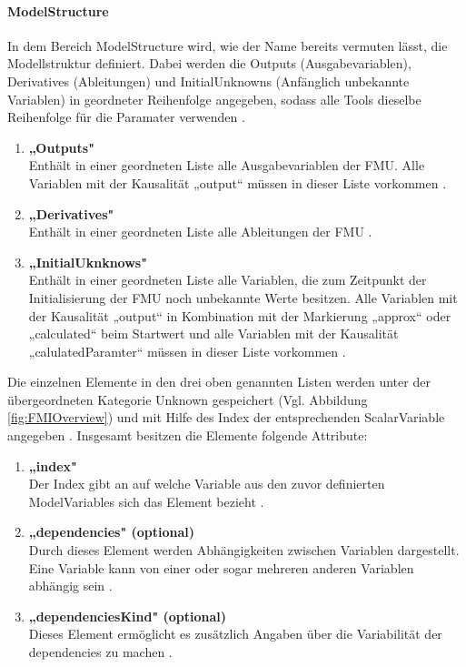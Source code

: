 \paragraph{ModelStructure}\label{sec:ModelStructure}
\noindent In dem Bereich ModelStructure wird, wie der Name bereits vermuten lässt, die Modellstruktur definiert. Dabei werden die Outputs (Ausgabevariablen), Derivatives (Ableitungen) und InitialUnknowns (Anfänglich unbekannte Variablen) in geordneter Reihenfolge angegeben, sodass alle Tools dieselbe Reihenfolge für die Paramater verwenden \cite[S.57]{25}.
\begin{enumerate}
	\item \textbf{„Outputs"} \cite[S.60]{25} \\
	Enthält in einer geordneten Liste alle Ausgabevariablen der FMU. Alle Variablen mit der 
	Kausalität „output“ müssen in dieser Liste vorkommen \cite[S.60]{25}.
	\item \textbf{„Derivatives"} \cite[S.60f]{25} \\
	Enthält in einer geordneten Liste alle Ableitungen der FMU \cite[S.60f]{25}.
	\item \textbf{„InitialUknknows"} \cite[S.61]{25} \\
	Enthält in einer geordneten Liste alle Variablen, die zum Zeitpunkt der Initialisierung der FMU	noch unbekannte Werte besitzen. Alle Variablen mit der Kausalität „output“ in Kombination mit der Markierung „approx“ oder „calculated“ beim Startwert  und alle Variablen mit der Kausalität „calulatedParamter“ müssen in dieser Liste vorkommen \cite[S.61]{25}.
\end{enumerate}
Die einzelnen Elemente in den drei oben genannten Listen werden unter der übergeordneten Kategorie Unknown gespeichert (Vgl. Abbildung \ref{fig:FMIOverview}) und mit Hilfe des Index der entsprechenden ScalarVariable angegeben \cite[S.61]{25}. Insgesamt besitzen die Elemente folgende Attribute:
\begin{enumerate}
	\item \textbf{„index"} \cite[S.62]{25} \\
	Der Index gibt an auf welche Variable aus den zuvor definierten ModelVariables sich das 
	Element bezieht \cite[S.62]{25}.
	\item \textbf{„dependencies" (optional)} \cite[S.62]{25} \\
	Durch dieses Element werden Abhängigkeiten zwischen Variablen dargestellt. Eine Variable
	kann von einer oder sogar mehreren anderen Variablen abhängig sein \cite[S.62]{25}.
	\item \textbf{„dependenciesKind" (optional)} \cite[S.63]{25} \\
	Dieses Element ermöglicht es zusätzlich Angaben über die Variabilität der dependencies zu 
	machen \cite[S.63]{25}.
\end{enumerate}
